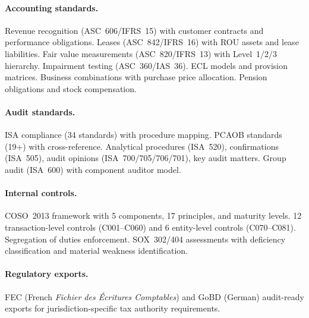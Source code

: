\paragraph{Accounting standards.}
Revenue recognition (ASC~606/IFRS~15) with customer contracts and
performance obligations.  Leases (ASC~842/IFRS~16) with ROU assets and
lease liabilities.  Fair value measurements (ASC~820/IFRS~13) with
Level~1/2/3 hierarchy.  Impairment testing (ASC~360/IAS~36).  ECL models
and provision matrices.  Business combinations with purchase price
allocation.  Pension obligations and stock compensation.

\paragraph{Audit standards.}
ISA compliance (34 standards) with procedure mapping.  PCAOB standards
(19+) with cross-reference.  Analytical procedures (ISA~520),
confirmations (ISA~505), audit opinions (ISA~700/705/706/701), key
audit matters.  Group audit (ISA~600) with component auditor model.

\paragraph{Internal controls.}
COSO~2013 framework with 5 components, 17 principles, and maturity
levels.  12 transaction-level controls (C001--C060) and 6 entity-level
controls (C070--C081).  Segregation of duties enforcement.
SOX~302/404 assessments with deficiency classification and material
weakness identification.

\paragraph{Regulatory exports.}
FEC (French \emph{Fichier des \'{E}critures Comptables}) and GoBD
(German) audit-ready exports for jurisdiction-specific tax authority
requirements.
